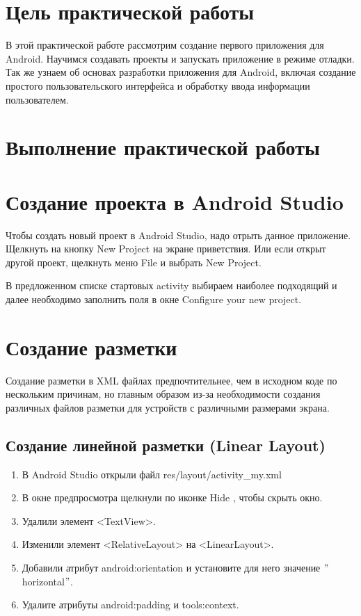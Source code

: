 \section*{\LARGE{Цель практической работы}}
В этой практической работе рассмотрим создание первого приложения для Android.
Научимся создавать проекты и запускать приложение в режиме отладки.
Так же узнаем об основах разработки приложения для Android, включая создание простого пользовательского интерфейса и
обработку ввода информации пользователем.

\newpage
\section*{\LARGE{Выполнение практической работы}}

\section{Создание проекта в Android Studio}
Чтобы создать новый проект в Android Studio, надо отрыть данное приложение.
Щелкнуть на кнопку New Project на экране приветствия.
Или если открыт другой проект, щелкнуть меню File и выбрать New Project.


В предложенном списке стартовых activity выбираем наиболее подходящий и далее необходимо заполнить поля в окне
Configure your new project.


\newpage

\section{Создание разметки}
Создание разметки в XML файлах предпочтительнее, чем в исходном коде по нескольким причинам, но главным образом из-за
необходимости создания различных файлов разметки для устройств с различными размерами экрана.

\subsection{Создание линейной разметки (Linear Layout)}
\begin{enumerate}
	\item В Android Studio открыли файл res/layout/activity\_my.xml
	\item В окне предпросмотра щелкнули по иконке Hide , чтобы скрыть окно.
	\item Удалили элемент <TextView>.
	\item Изменили элемент <RelativeLayout> на <LinearLayout>.
	\item Добавили атрибут android:orientation и установите для него значение \("\)horizontal\("\).
	\item Удалите атрибуты android:padding и tools:context.
\end{enumerate}

